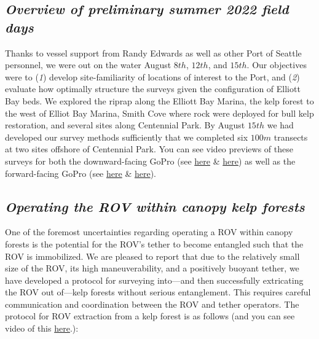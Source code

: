 \documentclass[11pt]{article}
\begin{document}
\subsection{\textit{Overview of preliminary summer 2022 field days}}
Thanks to vessel support from Randy Edwards as well as other Port of 
Seattle personnel, we were out on the water August $8th$, $12th$, and 
$15th$. 
Our objectives were to 
(\textit{1}) develop site-familiarity of locations of interest to the 
Port, and
(\textit{2}) evaluate how optimally structure the surveys given the 
configuration of Elliott Bay beds.
We explored the riprap along the Elliott Bay Marina, the kelp forest to 
the west of Elliot Bay Marina, Smith Cove where rock were deployed for 
bull kelp restoration, and several sites along Centennial Park.
By August $15th$ we had developed our survey methods sufficiently that 
we completed six $100m$ transects at two sites offshore of 
Centennial Park. 
You can see video previews of these surveys for both the 
downward-facing GoPro (see 
\href{https://drive.google.com/file/d/1BKpNbOoVZD69AsEt5G7JsOrkMyZvgtjx/view?usp=sharing}{here}
 \& 
\href{https://drive.google.com/file/d/1J8xVqzrCSNAGh-g5ZEFoMboQgHW_H4rA/view?usp=sharing}{here})
 as well as the forward-facing GoPro (see 
 \href{https://drive.google.com/file/d/1RK28xmY8yo-FMqfbQtPPxmdujq9r2AEu/view?usp=sharing}{here}
 \& 
\href{https://drive.google.com/file/d/1OGcqmQaU9CvSFK4At0ju36zfMBRCUGUl/view?usp=sharing}{here}).

\subsection{\textit{Operating the ROV within canopy kelp forests}}
One of the foremost uncertainties regarding operating a ROV within 
canopy forests is the potential for the ROV's tether to become 
entangled such that the ROV is immobilized.  
We are pleased to report that due to the relatively small size of the 
ROV, its high maneuverability, and a positively buoyant tether, we have 
developed a protocol for surveying into---and then successfully 
extricating the ROV out of---kelp forests without serious entanglement.
This requires careful communication and coordination between the ROV 
and tether operators. 
The protocol for ROV extraction from a kelp forest is as follows (and 
you can see video of this 
\href{https://drive.google.com/file/d/1qdtdPwB8RHkjL27RRzu95MTenNgszDAC/view?usp=sharing}{here}.):
\end{document}
